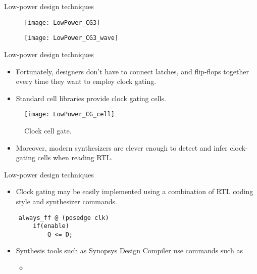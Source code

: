 \documentclass[]{slides}
\begin{document}
\begin{frame}{Low-power design techniques}{}
\vspace{-5pt}
\begin{figure}
\texttt{[image: LowPower\_CG3]}
\end{figure}
\vspace{-10pt}
\begin{figure}
\texttt{[image: LowPower\_CG3\_wave]}
\end{figure}
\end{frame}

\begin{frame}{Low-power design techniques}{}
\begin{itemize}
\item Fortunately, designers don't have to connect latches,  and flip-flops together every time they want to employ clock gating.
\item Standard cell libraries provide clock gating cells.
\end{itemize}
\begin{figure}
\texttt{[image: LowPower\_CG\_cell]}
\caption{Clock cell gate.}
\label{Figure:CG_cell}
\end{figure}
\begin{itemize}
\item Moreover, modern synthesizers are clever enough to detect and infer clock-gating cells when reading \ac{RTL}. 
\end{itemize}
\end{frame}

\begin{frame}[fragile]{Low-power design techniques}{}
\begin{itemize}
\item Clock gating may be easily implemented using a combination of \ac{RTL} coding style and synthesizer commands.
\end{itemize}
    \lstset{
    numbers=none,
    captionpos=t,
    title=Clock gating in RTL,
    xleftmargin=.2\textwidth, xrightmargin=.2\textwidth
  }
  \begin{lstlisting}
    always_ff @ (posedge clk)
        if(enable)
            Q <= D;
  \end{lstlisting}
  
\begin{itemize}
\item Synthesis tools such as Synopsys Design Compiler use commands such as
\begin{itemize}
  \item[] 
\end{itemize}
 
\end{itemize}

\end{frame}
\end{document}
